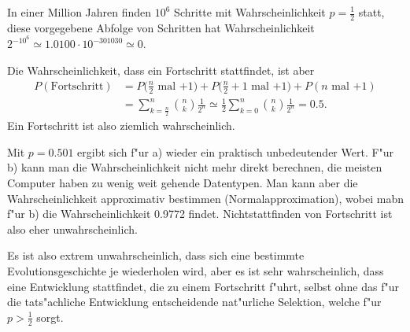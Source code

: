 \begin{loesung}
\begin{teilaufgaben}
\item
In einer Million Jahren finden $10^6$ Schritte mit Wahrscheinlichkeit
$p=\frac12$ statt, diese vorgegebene Abfolge von Schritten hat
Wahrscheinlichkeit $2^{-10^{6}}\simeq 1.0100\cdot 10^{-301030}\simeq 0$.
\item
Die Wahrscheinlichkeit, dass ein Fortschritt stattfindet, ist aber
\begin{align*}
P(\text{Fortschritt})
&=
P\biggl(\text{$\frac{n}2$ mal $+1$}\biggr)
+
P\biggl(\text{$\frac{n}2+1$ mal $+1$}\biggr)
+
P(\text{$n$ mal $+1$})
\\
&=
\sum_{k=\frac{n}2}^n\binom{n}{k}\frac1{2^n}
\simeq
\frac12
\sum_{k=0}^n\binom{n}{k}\frac1{2^n}
= 0.5.
\end{align*}
Ein Fortschritt ist also ziemlich wahrscheinlich.
\end{teilaufgaben}
Mit $p=0.501$ ergibt sich f"ur a) wieder ein praktisch unbedeutender
Wert. F"ur b) kann man die Wahrscheinlichkeit nicht mehr direkt
berechnen, die meisten Computer haben zu wenig weit gehende
Datentypen. Man kann aber die Wahrscheinlichkeit approximativ
bestimmen (Normalapproximation), wobei mabn f"ur b) die Wahrscheinlichkeit
0.9772 findet. Nichtstattfinden von Fortschritt ist also eher unwahrscheinlich.

Es ist also extrem unwahrscheinlich, dass sich eine bestimmte
Evolutionsgeschichte je wiederholen wird, aber es ist sehr wahrscheinlich,
dass eine Entwicklung stattfindet, die zu einem Fortschritt f"uhrt,
selbst ohne das f"ur die tats"achliche Entwicklung entscheidende
nat"urliche Selektion, welche f"ur $p>\frac12$ sorgt.
\end{loesung}

